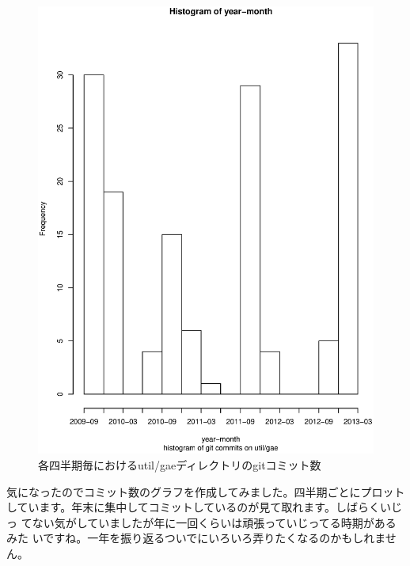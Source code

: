 \documentclass[mingoth,a4paper]{jsarticle}
\begin{document}
\begin{figure}
\begin{center}
\includegraphics[width=1\hsize]{image201304/util-gae-commits.eps}
\end{center}
\caption{各四半期毎におけるutil/gaeディレクトリのgitコミット数}
\end{figure}

気になったのでコミット数のグラフを作成してみました。四半期ごとにプロット
しています。年末に集中してコミットしているのが見て取れます。しばらくいじっ
てない気がしていましたが年に一回くらいは頑張っていじってる時期があるみた
いですね。一年を振り返るついでにいろいろ弄りたくなるのかもしれません。


\end{document}
